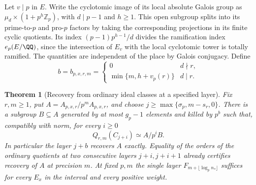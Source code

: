 \documentclass[a4paper,11pt]{article}
\newtheorem{theorem}[proposition]{Theorem}
\theoremstyle{definition}
\theoremstyle{remark}
\newcommand{\ZZ}{\mathbb Z}\newcommand{\ord}{\operatorname{ord}}
\numberwithin{equation}{section}
\begin{document}
Let \(v\mid p\) in \(E\). Write the cyclotomic image of its local
absolute Galois group as \(\mu_d\times(1+p^h\ZZ_p)\), with
\(d\mid p-1\) and \(h\ge1\). This open subgroup splits into its
prime-to-\(p\) and pro-\(p\) factors by taking the corresponding
projections in its finite cyclic quotients. Its index
\((p-1)p^{h-1}/d\) divides the ramification index \(e_p(E/\QQ)\),
since the intersection of \(E_v\) with the local cyclotomic tower
is totally ramified. The quantities are independent of the place
by Galois conjugacy. Define
\[
 b=b_{p,x,r,m}=
 \begin{cases}
  0 & d\nmid r,\\
  \min\{m,h+v_p(r)\} & d\mid r .
 \end{cases}
\]

\begin{theorem}[Recovery from ordinary ideal classes at a specified layer]
\leavevmode\label{thm:ordinarydigits514}
Fix \(r,m\ge1\), put \(A=A_{p,x,r}/p^m A_{p,x,r}\), and choose
\(j\ge\max\{\sigma_p,m-s_r,0\}\). There is a subgroup \(B\subseteq A\)
generated by at most \(g_p-1\) elements and killed by \(p^b\) such
that, compatibly with norm, for every \(i\ge0\)
\[
        Q_{r,m}(C_{j+i})\simeq A/p^i B.
\]
In particular the layer \(j+b\) recovers \(A\) exactly. Equality
of the orders of the ordinary quotients at two consecutive layers
\(j+i,j+i+1\) already certifies recovery of \(A\) at precision
\(m\). At fixed \(p,m\) the single layer
\(F_{m+\lfloor\log_p n_*\rfloor}\) suffices for every
\(E_x\) in the interval and every positive weight.
\end{theorem}
\end{document}
